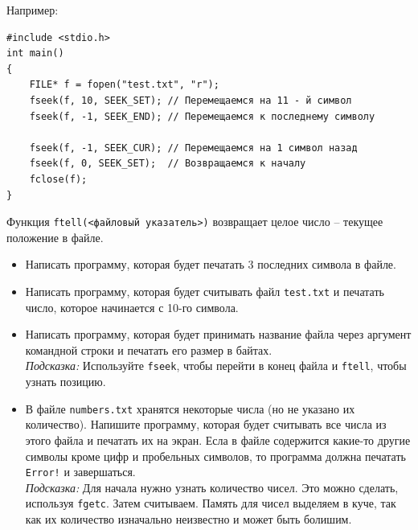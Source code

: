\documentclass{article}
\begin{document}
Например:
\begin{lstlisting}
#include <stdio.h>
int main()
{
	FILE* f = fopen("test.txt", "r");
	fseek(f, 10, SEEK_SET); // Перемещаемся на 11 - й символ
	fseek(f, -1, SEEK_END); // Перемещаемся к последнему символу
	
	fseek(f, -1, SEEK_CUR); // Перемещаемся на 1 символ назад
	fseek(f, 0, SEEK_SET);  // Возвращаемся к началу
	fclose(f);
}

\end{lstlisting}

Функция \texttt{ftell(<файловый указатель>)} возвращает целое число -- текущее положение в файле.

\begin{itemize}
\item Написать программу, которая будет печатать 3 последних символа в файле.\\
\item Написать программу, которая будет считывать файл \texttt{test.txt} и печатать число, которое начинается с 10-го символа.
\item Написать программу, которая будет принимать название файла через аргумент командной строки и печатать его размер в байтах.\\
\textit{Подсказка:} Используйте \texttt{fseek}, чтобы перейти в конец файла и \texttt{ftell}, чтобы узнать позицию.

\item В файле \texttt{numbers.txt} хранятся некоторые числа (но не указано их количество). Напишите программу, которая будет считывать все числа из этого файла и печатать их на экран. Есла в файле содержится какие-то другие символы кроме цифр и пробельных символов, то программа должна печатать \texttt{Error!} и завершаться.\\
\textit{Подсказка:} Для начала нужно узнать количество чисел. Это можно сделать, используя \texttt{fgetc}. Затем считываем. Память для чисел выделяем в куче, так как их количество изначально неизвестно и может быть болишим.
\end{itemize}
\end{document}
